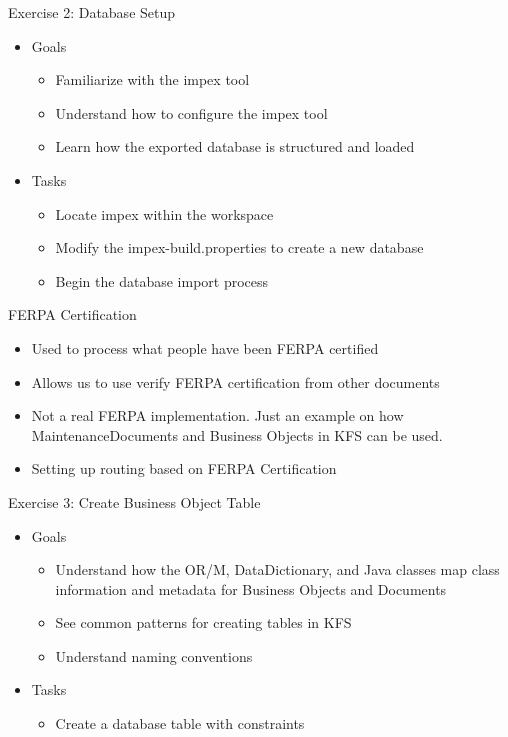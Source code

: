 \documentclass[xcolor=dvipsnames,14pt]{beamer}
\begin{document}
\begin{frame}{Exercise 2: Database Setup}
	\begin{itemize}
		\item Goals
          \begin{itemize}
            \item Familiarize with the impex tool
            \item Understand how to configure the impex tool
            \item Learn how the exported database is structured and loaded
          \end{itemize}          
		\item Tasks
          \begin{itemize}
          \item Locate impex within the workspace
          \item Modify the impex-build.properties to create a new
            database
          \item Begin the database import process
          \end{itemize}          

	\end{itemize}
\end{frame}

\begin{frame}{FERPA Certification}
  \begin{itemize}
    \item Used to process what people have been FERPA certified
    \item Allows us to use verify FERPA certification from other documents
    \item Not a real FERPA implementation. Just an example on how
      MaintenanceDocuments and Business Objects in KFS can be used.
    \item Setting up routing based on FERPA Certification
  \end{itemize}
\end{frame}

\begin{frame}{Exercise 3: Create Business Object Table}
	\begin{itemize}
		\item Goals
          \begin{itemize}
            \item Understand how the OR/M, DataDictionary, and Java
              classes map class information and metadata for Business
              Objects and Documents
            \item See common patterns for creating tables in KFS
            \item Understand naming conventions
          \end{itemize}          
		\item Tasks
          \begin{itemize}
            \item Create a database table with constraints
          \end{itemize}          
	\end{itemize}
\end{frame}
\end{document}
